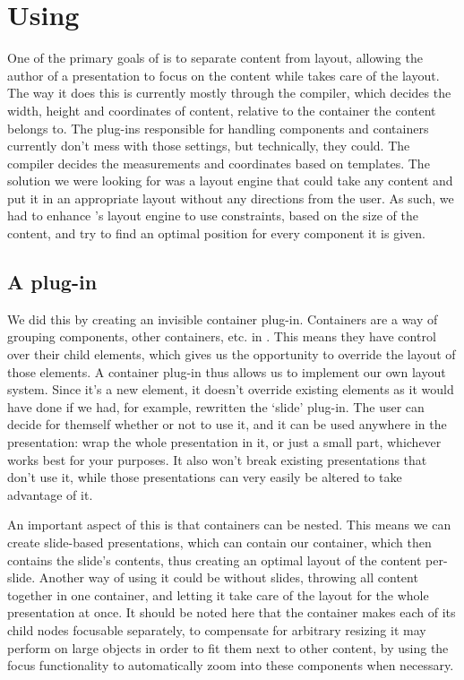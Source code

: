   \section{Using \mxp}

   One of the primary goals of \mxp is to separate content from layout,
   allowing the author of a presentation to focus on the content while \mxp
   takes care of the layout. The way it does this is currently mostly through
   the compiler, which decides the width, height and coordinates of content,
   relative to the container the content belongs to. The plug-ins responsible
   for handling components and containers currently don't mess with those
   settings, but technically, they could. The compiler decides the measurements
   and coordinates based on templates. The solution we were looking for was a
   layout engine that could take any content and put it in an appropriate
   layout without any directions from the user. As such, we had to enhance
   \mxp's layout engine to use constraints, based on the size of the content,
   and try to find an optimal position for every component it is given.

   \subsection{A \mxp plug-in}
    \label{mxp-plug-in}

    We did this by creating an invisible container plug-in. Containers are a
    way of grouping components, other containers, etc. in \mxp. This means they
    have control over their child elements, which gives us the opportunity to
    override the layout of those elements. A container plug-in thus allows us
    to implement our own layout system. Since it's a new element, it doesn't
    override existing elements as it would have done if we had, for example,
    rewritten the `slide' plug-in. The user can decide for themself whether or
    not to use it, and it can be used anywhere in the presentation: wrap the
    whole presentation in it, or just a small part, whichever works best for
    your purposes. It also won't break existing presentations that don't use
    it, while those presentations can very easily be altered to take advantage
    of it.

    An important aspect of this is that containers can be nested. This means we
    can create slide-based presentations, which can contain our
     container, which then contains the slide's contents, thus
    creating an optimal layout of the content per-slide. Another way of using
    it could be without slides, throwing all content together in one
     container, and letting it take care of the layout for the
    whole presentation at once. It should be noted here that the
     container makes each of its child nodes focusable
    separately, to compensate for arbitrary resizing it may perform on large
    objects in order to fit them next to other content, by using the focus
    functionality to automatically zoom into these components when necessary.
  
